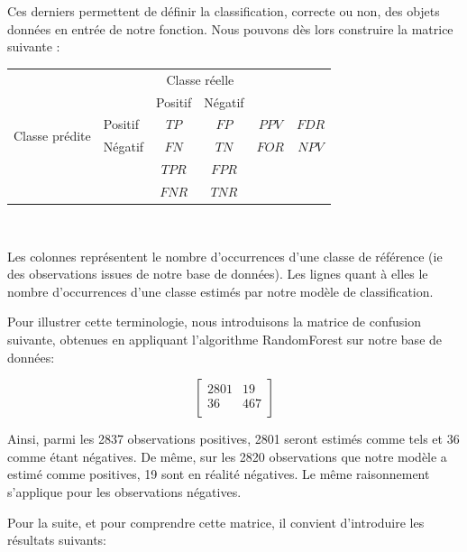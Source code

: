 \documentclass[a4paper]{report}
\begin{document}
~\par

~\par

Ces derniers permettent de définir la classification, correcte ou non, des objets données en entrée de notre fonction. Nous pouvons dès lors construire la matrice suivante : 

\begin{tabular}{ l | l | c | c | c c}
\multicolumn{2}{c}{} & \multicolumn{2}{c}{Classe réelle} & \\
\cline{3-4}
\multicolumn{2}{c|}{} & Positif & Négatif \\
\cline{2-4}
\multirow{2}{*}{Classe prédite} & Positif & $TP$ & $FP$ & $PPV$ & $FDR$ \\
\cline{2-4}
& Négatif & $FN$ & $TN$ & $FOR$ & $NPV$ \\
\cline{2-4}
\multicolumn{1}{r}{} & \multicolumn{1}{l}{} & \multicolumn{1}{c}{$TPR$} & \multicolumn{1}{c}{$FPR$} \\
\multicolumn{1}{l}{} & \multicolumn{1}{l}{} & \multicolumn{1}{c}{$FNR$} & \multicolumn{1}{c}{$TNR$} \\
\end{tabular}

~\par
Les colonnes représentent le nombre d'occurrences d’une classe de référence (ie des observations issues de notre base de données). Les lignes quant à elles le nombre d'occurrences d’une classe estimés par notre modèle de classification. 
~\par
\medskip
Pour illustrer cette terminologie, nous introduisons la matrice de confusion suivante, obtenues en appliquant l’algorithme RandomForest sur notre base de données:

$$\begin{bmatrix}
2801 & 19 \\ 
36 & 467 \\
\end{bmatrix}$$

Ainsi, parmi les 2837 observations positives, 2801 seront estimés comme tels et 36 comme étant négatives. De même, sur les 2820 observations que notre modèle a estimé comme positives, 19 sont en réalité négatives. Le même raisonnement s’applique pour les observations négatives. 


Pour la suite, et pour comprendre cette matrice, il convient d'introduire les résultats suivants:
\end{document}
